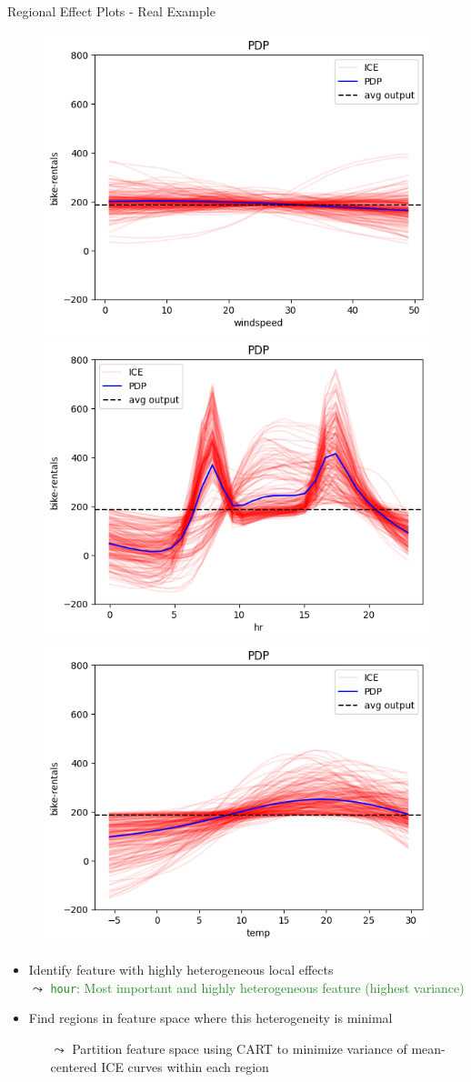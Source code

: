 \documentclass[11pt,compress,t,notes=noshow, aspectratio=169, xcolor=table,dvipsnames]{beamer}
\begin{document}
\begin{frame}{Regional Effect Plots - Real Example}
\begin{figure}
    \centering
    \includegraphics[width=0.325\linewidth]{figure/01_bike_sharing_dataset_18_4.png}
    \includegraphics[width=0.325\linewidth]{figure/01_bike_sharing_dataset_18_1.png}
    \includegraphics[width=0.325\linewidth]{figure/01_bike_sharing_dataset_18_2.png}%
\end{figure}
\begin{itemize}
\item Identify feature with highly heterogeneous local effects\\
$\leadsto$ \textcolor{ForestGreen}{\texttt{hour}: Most important and highly heterogeneous feature (highest variance)}
\item Find regions in feature space where this heterogeneity is minimal
\begin{itemize}
    \item[$\leadsto$] Partition feature space using CART to minimize variance of mean-centered ICE curves within each region
\end{itemize}
\end{itemize}
\end{frame}
\end{document}
